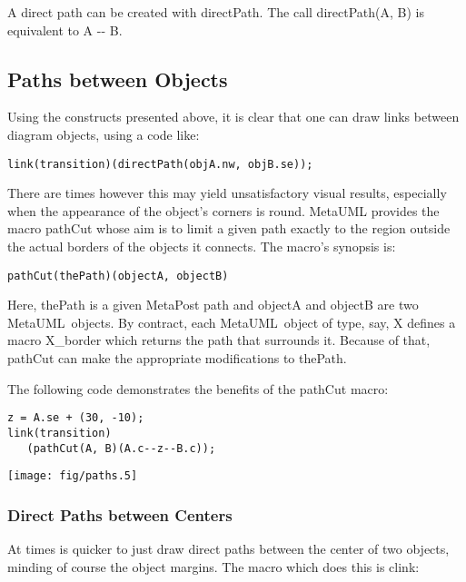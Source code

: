 \documentclass{article}
\newcommand{\code}{\ttfamily}
\newcommand{\metauml}{MetaUML}
\begin{document}
A direct path can be created with {\code directPath}. The call {\code directPath(A, B)}
is equivalent to {\code A -{}-  B}.

\subsection{Paths between Objects}

Using the constructs presented above, it is clear that one can draw links between diagram
objects, using a code like:

\begin{verbatim}
link(transition)(directPath(objA.nw, objB.se));
\end{verbatim}

There are times however this may yield unsatisfactory visual results,
especially when the appearance of the object's corners is round. MetaUML provides the macro
{\code pathCut} whose aim is to limit a given path exactly to the region outside the actual
borders of the objects it connects. The macro's synopsis is:

\begin{verbatim}
pathCut(thePath)(objectA, objectB)
\end{verbatim}

Here, {\code thePath} is a given MetaPost path and {\code objectA} and {\code objectB}
are two \metauml\ objects. By contract, each \metauml\ object of type, say, {\code X}
defines a macro {\code X\_border} which returns the path that surrounds it. Because
of that, {\code pathCut} can make the appropriate modifications to {\code thePath}.

The following code demonstrates the benefits of the {\code pathCut} macro:

\begin{multicols}{2}
\begin{verbatim}
z = A.se + (30, -10);
link(transition)
   (pathCut(A, B)(A.c--z--B.c));
\end{verbatim}
\columnbreak
\hspace{1cm}\texttt{[image: fig/paths.5]}
\end{multicols}

\subsubsection{Direct Paths between Centers}

At times is quicker to just draw direct paths between the center of two objects,
minding of course the object margins. The macro which does this is {\code clink}:
\end{document}
